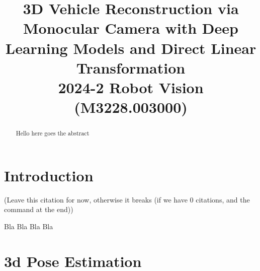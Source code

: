 \documentclass[conference]{IEEEtran}
\begin{document}
\title{3D Vehicle Reconstruction via Monocular Camera with Deep Learning Models and Direct Linear Transformation\\
{\footnotesize 2024-2 Robot Vision (M3228.003000)}
}

\author{
    \and
    \and
}

\maketitle

\begin{abstract}
    Hello here goes the abstract
\end{abstract}

\section{Introduction}
\begin{center}
    \cite{main-article}
    (Leave this citation for now, otherwise it breaks (if we have 0 citations, and the command at the end))
\end{center}

Bla Bla Bla Bla

\section{3d Pose Estimation}
\setcounter{MaxMatrixCols}{20}
\end{document}
